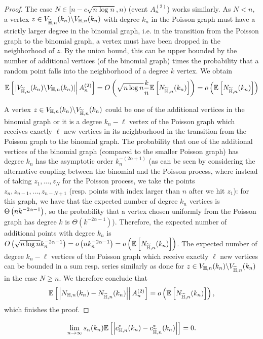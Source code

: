 \begin{proof}
The case $N \in [n-c\sqrt{n\log n},n)$ (event $A_n^{(2)}$) works similarly.
As $N < n$, a vertex $z \in V_{\widetilde{\mathbb{H}},n}(k_n) \backslash V_{\mathbb{H},n}(k_n)$ with degree $k_n$ in the Poisson graph must have a strictly larger degree in the binomial graph, i.e. in the transition from the Poisson graph to the binomial graph, a vertex must have been dropped in the neighborhood of $z$. By the union bound, this can be upper bounded by the number of additional vertices (of the binomial graph) times the probability that a random point falls into the neighborhood of a degree $k$ vertex. We obtain
\begin{align*}
	\mathbb{E}\left[\left.|V_{\widetilde{\mathbb{H}},n}(k_n) \backslash V_{\mathbb{H},n}(k_n)|\right|A_n^{(2)}\right] = O\left( \sqrt{n\log n}\frac{k}{n} \mathbb{E}\left[N_{\widetilde{\mathbb{H}},n}(k_n)\right] \right)
	= o\left(\mathbb{E}\left[N_{\widetilde{\mathbb{H}},n}(k_n)\right]\right)
\end{align*}

A vertex $z \in V_{\mathbb{H},n}(k_n) \backslash V_{\widetilde{\mathbb{H}},n}(k_n)$ could be one of the additional vertices in the binomial graph or it is a degree $k_n-\ell$ vertex of the Poisson graph which receives exactly $\ell$ new vertices in its neighborhood in the transition from the Poisson graph to the binomial graph. The probability that one of the additional vertices of the binomial graph (compared to the smaller Poisson graph) has degree $k_n$ has the asymptotic order $k_n^{-(2\alpha+1)}$ (as can be seen by considering the alternative coupling between the binomial and the Poisson process, where instead of taking $z_1, \dots, z_N$ for the Poisson process, we take the points $z_n, z_{n-1}, \dots, z_{n-N+1}$ (resp. points with index larger than $n$ after we hit $z_1$): for this graph, we have that the expected number of degree $k_n$ vertices is $\Theta\left(n k^{-2\alpha-1}\right)$, so the probability that a vertex chosen uniformly from the Poisson graph has degree $k$ is $\Theta(k^{-2\alpha-1})$). Therefore, the expected number of additional points with degree $k_n$ is $O\left(\sqrt{n\log n} k_n^{-2\alpha-1}\right) = o\left(n k_n^{-2\alpha-1}\right) = o\left(\mathbb{E}\left[N_{\widetilde{\mathbb{H}},n}(k_n)\right]\right)$. The expected number of degree $k_n-\ell$ vertices of the Poisson graph which receive exactly $\ell$ new vertices can be bounded in a sum resp. series similarly as done for $z \in V_{\mathbb{H},n}(k_n) \backslash V_{\widetilde{\mathbb{H}},n}(k_n)$ in the case $N \geq n$. We therefore conclude that
\[
	\mathbb{E}\left[\left.\left|N_{\mathbb{H},n}(k_n)-N_{\widetilde{\mathbb{H}},n}(k_n)\right|\right|A_n^{(2)}\right] = o\left(\mathbb{E}\left[N_{\widetilde{\mathbb{H}},n}(k_n)\right]\right),
\]
which finishes the proof.
\end{proof}

\begin{proposition}\label{prop:clustering_ast_H_Pois}
\[
	\lim_{n \to \infty} s_\alpha(k_n)\mathbb{E}\left[\left|c_{\mathbb{H},n}^\ast(k_n) - c_{\widetilde{\mathbb{H}},n}^\ast(k_n)\right|\right] = 0.
\]
\end{proposition}

